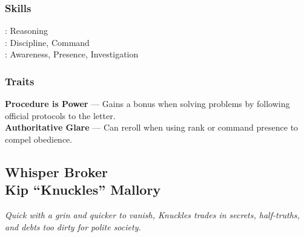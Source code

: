 \begin{paracol}{3}
        \switchcolumn      
        \subsubsection{Skills}
            \noindent\Expert: Reasoning \\
            \noindent\Skilled: Discipline, Command \\
            \noindent\Novice: Awareness, Presence, Investigation \\
        \subsubsection{Traits}
            \textbf{Procedure is Power} — Gains a bonus when solving problems by following official protocols to the letter.\\
            \noindent\textbf{Authoritative Glare} — Can reroll when using rank or command presence to compel obedience.\\
    \end{paracol}

    \clearpage
    \subsection{{\small Whisper Broker}\\ Kip “Knuckles” Mallory}
    \label{npc:kip-mallory}
    
    \emph{Quick with a grin and quicker to vanish, Knuckles trades in secrets, half-truths, and debts too dirty for polite society.}
    \vspace{.5\baselineskip}
    
